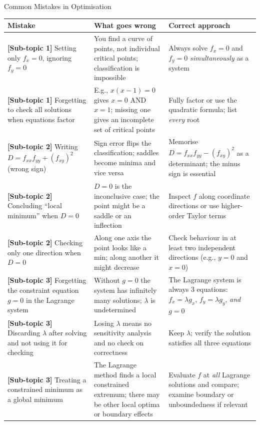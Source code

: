 \documentclass[12pt,a4paper]{article}
\begin{document}
\begin{mistakebox}{Common Mistakes in Optimisation}
\begin{tabular}{@{}p{4.5cm}p{4.5cm}p{4.5cm}@{}}
\toprule
\textbf{Mistake} & \textbf{What goes wrong} & \textbf{Correct approach} \\
\midrule
\textbf{[Sub-topic 1]} Setting only $f_x = 0$, ignoring $f_y = 0$ & You find a curve of points, not individual critical points; classification is impossible & Always solve $f_x = 0$ and $f_y = 0$ \emph{simultaneously} as a system \\
\midrule
\textbf{[Sub-topic 1]} Forgetting to check all solutions when equations factor & E.g., $x(x-1)=0$ gives $x=0$ AND $x=1$; missing one gives an incomplete set of critical points & Fully factor or use the quadratic formula; list \emph{every} root \\
\midrule
\textbf{[Sub-topic 2]} Writing $D = f_{xx}f_{yy} + (f_{xy})^2$ (wrong sign) & Sign error flips the classification; saddles become minima and vice versa & Memorise $D = f_{xx}f_{yy} - (f_{xy})^2$ as a determinant; the minus sign is essential \\
\midrule
\textbf{[Sub-topic 2]} Concluding ``local minimum'' when $D = 0$ & $D = 0$ is the inconclusive case; the point might be a saddle or an inflection & Inspect $f$ along coordinate directions or use higher-order Taylor terms \\
\midrule
\textbf{[Sub-topic 2]} Checking only one direction when $D = 0$ & Along one axis the point looks like a min; along another it might decrease & Check behaviour in at least two independent directions (e.g., $y=0$ and $x=0$) \\
\midrule
\textbf{[Sub-topic 3]} Forgetting the constraint equation $g = 0$ in the Lagrange system & Without $g=0$ the system has infinitely many solutions; $\lambda$ is undetermined & The Lagrange system is always 3 equations: $f_x=\lambda g_x$, $f_y=\lambda g_y$, \emph{and} $g=0$ \\
\midrule
\textbf{[Sub-topic 3]} Discarding $\lambda$ after solving and not using it for checking & Losing $\lambda$ means no sensitivity analysis and no check on correctness & Keep $\lambda$; verify the solution satisfies all three equations \\
\midrule
\textbf{[Sub-topic 3]} Treating a constrained minimum as a global minimum & The Lagrange method finds a local constrained extremum; there may be other local optima or boundary effects & Evaluate $f$ at \emph{all} Lagrange solutions and compare; examine boundary or unboundedness if relevant \\
\bottomrule
\end{tabular}
\end{mistakebox}
\end{document}
